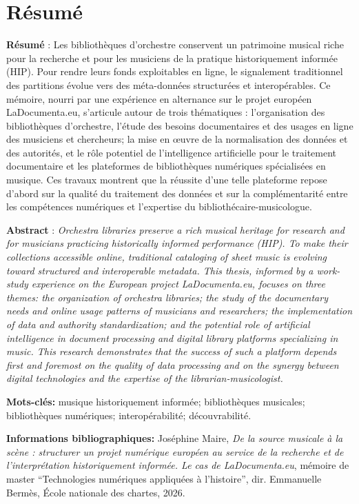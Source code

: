\documentclass[12pt,twoside]{book}
\begin{document}
	\chapter{Résumé}
	
	\textbf {Résumé} : Les bibliothèques d’orchestre conservent un patrimoine musical riche pour la recherche et pour les musiciens de la pratique historiquement informée (HIP). Pour rendre leurs fonds exploitables en ligne, le signalement traditionnel des partitions évolue vers des méta-données structurées et interopérables. Ce mémoire, nourri par une expérience en alternance sur le projet européen LaDocumenta.eu, s’articule autour de trois thématiques : l'organisation des bibliothèques d'orchestre, l’étude des besoins documentaires et des usages en ligne des musiciens et chercheurs; la mise en œuvre de la normalisation des données et des autorités, et le rôle potentiel de l’intelligence artificielle pour le traitement documentaire et les plateformes de bibliothèques numériques spécialisées en musique. Ces travaux montrent que la réussite d'une telle plateforme repose d'abord sur la qualité du traitement des données et sur la complémentarité entre les compétences numériques et l'expertise du bibliothécaire-musicologue.
	
	
	\medskip\textbf{Abstract} : \textit{Orchestra libraries preserve a rich musical heritage for research and for musicians practicing historically informed performance (HIP). To make their collections accessible online, traditional cataloging of sheet music is evolving toward structured and interoperable metadata. This thesis, informed by a work-study experience on the European project LaDocumenta.eu, focuses on three themes: the organization of orchestra libraries; the study of the documentary needs and online usage patterns of musicians and researchers; the implementation of data and authority standardization; and the potential role of artificial intelligence in document processing and digital library platforms specializing in music. This research demonstrates that the success of such a platform depends first and foremost on the quality of data processing and on the synergy between digital technologies and the expertise of the librarian-musicologist.}
	
	\medskip\medskip\textbf{Mots-clés:} musique historiquement informée; bibliothèques musicales; bibliothèques numériques; interopérabilité; découvrabilité.
	
	\newpage
	\textbf{Informations bibliographiques:} Joséphine Maire, \textit{De la source musicale à la scène : structurer un projet numérique européen au service de la recherche et de l'interprétation historiquement informée. Le cas de LaDocumenta.eu}, mémoire de master \enquote{Technologies numériques appliquées à l'histoire}, dir. Emmanuelle Bermès, École nationale des chartes, 2026.
	
\end{document}

